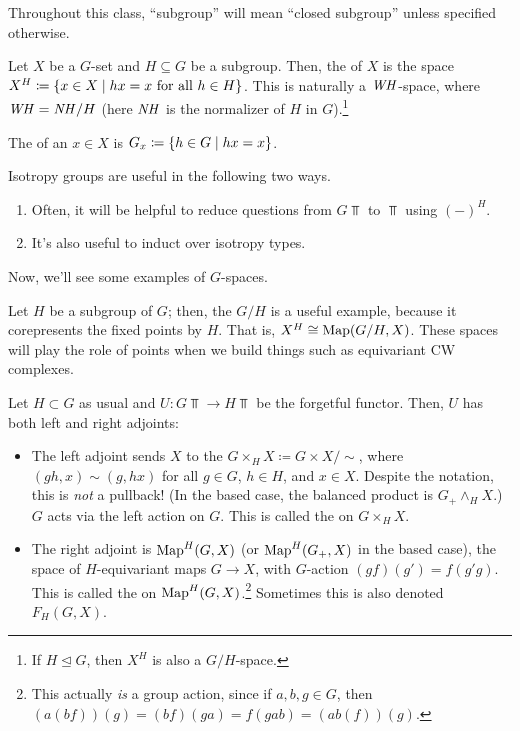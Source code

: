 Throughout this class, ``subgroup'' will mean ``closed subgroup'' unless specified otherwise.
\begin{defn}
Let $X$ be a $G$-set and $H\subseteq G$ be a subgroup. Then, the  of $X$ is the space $X^H\coloneqq \{x\in X\mid hx = x\text{ for all } h\in H\}$. This is naturally a
$\mathit{WH}$-space, where $\mathit{WH} = \mathit{NH}/H$ (here $\mathit{NH}$ is the normalizer of $H$ in $G$).\footnote{If $H\trianglelefteq G$,
then $X^H$ is also a $G/H$-space.}
\end{defn}
\begin{defn}
The  of an $x\in X$ is $G_x\coloneqq \{h\in G\mid hx = x\}$.
\end{defn}
Isotropy groups are useful in the following two ways.
\begin{enumerate}
	\item Often, it will be helpful to reduce questions from $G\Top$ to $\Top$ using $(-)^H$.
	\item It's also useful to induct over isotropy types.
\end{enumerate}
Now, we'll see some examples of $G$-spaces.
\begin{exm}
Let $H$ be a subgroup of $G$; then, the  $G/H$ is a useful example, because it corepresents the
fixed points by $H$. That is, $X^H \cong \operatorname{Map}(G/H, X)$. These spaces will play the role of points when we build
things such as equivariant CW complexes.
\end{exm}
\begin{exm}
Let $H\subset G$ as usual and $U\colon G\Top\to H\Top$ be the forgetful functor. Then, $U$ has both left and right
adjoints:
\begin{itemize}
	\item The left adjoint sends $X$ to the  $G\times_H X\coloneqq G\times X/\sim$, where
	$(gh, x)\sim (g, hx)$ for all $g\in G$, $h\in H$, and $x\in X$. Despite the notation, this is \emph{not} a
	pullback! (In the based case, the balanced product is $G_+\wedge_H X$.) $G$ acts via the left action on $G$.
	This is called the  on $G\times_H X$.
	\item The right adjoint is $\operatorname{Map}^H(G,X)$ (or $\operatorname{Map}^H(G_+, X)$ in the based case), the space of $H$-equivariant
	maps $G\to X$, with $G$-action $(gf)(g') = f(g'g)$. This is called the  on $\operatorname{Map}^H(G,X)$.\footnote{This actually \emph{is} a group action, since if
	$a,b,g\in G$, then $(a(b f))(g) = (bf)(ga) = f(gab) = (ab(f))(g)$.} Sometimes this is also denoted $F_H(G,
	X)$.\qedhere
\end{itemize}
\end{exm}

